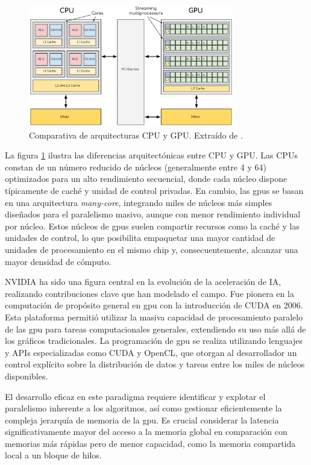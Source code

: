 \documentclass[11pt,spanish,listoffigures,listoftables]{tfgetsinf}
\begin{document}
\begin{figure}[H]
   \centering
   \includegraphics[width=0.8\textwidth]{images/estado_del_arte/cpu_vs_gpu.png}
   \caption[Comparativa de arquitecturas CPU y GPU]{Comparativa de arquitecturas CPU y GPU. Extraído de \cite{enccs_gpu_ecosystem}.}
   \label{fig:cpu_vs_gpu}
\end{figure}
La figura \ref{fig:cpu_vs_gpu} ilustra las diferencias arquitectónicas entre CPU y GPU. Las CPUs constan de un número reducido de núcleos (generalmente entre 4 y 64) optimizados para un alto rendimiento secuencial, donde cada núcleo dispone típicamente de caché y unidad de control privadas. En cambio, las \glspl{gpu} se basan en una arquitectura \textit{many-core}, integrando miles de núcleos más simples diseñados para el paralelismo masivo, aunque con menor rendimiento individual por núcleo. Estos núcleos de \glspl{gpu} suelen compartir recursos como la caché y las unidades de control, lo que posibilita empaquetar una mayor cantidad de unidades de procesamiento en el mismo chip y, consecuentemente, alcanzar una mayor densidad de cómputo.


NVIDIA ha sido una figura central en la evolución de la aceleración de IA, realizando contribuciones clave que han modelado el campo. Fue pionera en la computación de propósito general en \gls{gpu} con la introducción de CUDA en 2006. Esta plataforma permitió utilizar la masiva capacidad de procesamiento paralelo de las \gls{gpu} para tareas computacionales generales, extendiendo su uso más allá de los gráficos tradicionales. La programación de \gls{gpu} se realiza utilizando lenguajes y APIs especializadas como CUDA y OpenCL, que otorgan al desarrollador un control explícito sobre la distribución de datos y tareas entre los miles de núcleos disponibles.

El desarrollo eficaz en este paradigma requiere identificar y explotar el paralelismo inherente a los algoritmos, así como gestionar eficientemente la compleja jerarquía de memoria de la \gls{gpu}. Es crucial considerar la latencia significativamente mayor del acceso a la memoria global en comparación con memorias más rápidas pero de menor capacidad, como la memoria compartida local a un bloque de hilos.
\end{document}
